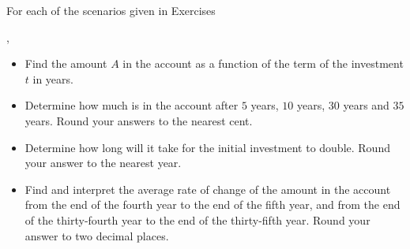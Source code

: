 {\noindent For each of the scenarios given in Exercises}
{, 
\begin{itemize}

\item  Find the amount $A$ in the account as a function of the term of the investment $t$ in years. 

\item  Determine how much is in the account after $5$ years, $10$ years, $30$ years and $35$ years.  Round your answers to the nearest cent.

\item  Determine how long will it take for the initial investment to double.  Round your answer to the nearest year.

\item  Find and interpret the average rate of change of the amount in the account from the end of
the fourth year to the end of the fifth year, and from the end of the thirty-fourth year to the
end of the thirty-fifth year.  Round your answer to two decimal places.

\end{itemize} }
